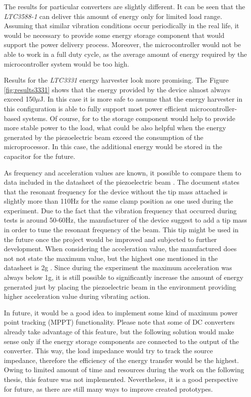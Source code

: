 \documentclass[12pt,a4paper]{article}
\begin{document}
The results for particular converters are slightly different. It can be seen that the \textit{LTC3588-1} can deliver this amount of energy only for limited load range. Assuming that similar vibration conditions occur periodically in the real life, it would be necessary to provide some energy storage component that would support the power delivery process. Moreover, the microcontroller would not be able to work in a full duty cycle, as the average amount of energy required by the microcontroller system would be too high.
\par
Results for the \textit{LTC3331} energy harvester look more promising. The Figure \ref{fig:results3331} shows that the energy provided by the device almost always exceed 150$\mu$J. In this case it is more safe to assume that the energy harvester in this configuration is able to fully support most power efficient microcontroller-based systems. Of course, for to the storage component would help to provide more stable power to the load, what could be also helpful when the energy generated by the piezoelectric beam exceed the consumption of the microprocessor. In this case, the additional energy would be stored in the capacitor for the future.
\par
As frequency and acceleration values are known, it possible to compare them to data included in the datasheet of the piezoelectric beam \cite{PPA}. The document states that the resonant frequency for the device without the tip mass attached is slightly more than 110Hz for the same clamp position as one used during the experiment. Due to the fact that the vibration frequency that occurred during tests is around 50-60Hz, the manufacturer of the device suggest to add a tip mass in order to tune the resonant frequency of the beam. This tip might be used in the future once the project would be improved and subjected to further development. When considering the acceleration value, the manufactured does not not state the maximum value, but the highest one mentioned in the datasheet is 2g \cite{PPA}. Since during the experiment the maximum acceleration was always below 1g, it is still possible to significantly increase the amount of energy generated just by placing the piezoelectric beam in the environment providing higher acceleration value during vibrating action.
\par

In future, it would be a good idea to implement some kind of maximum power point tracking (MPPT) functionality. Please note that some of DC converters already take advantage of this feature, but the following solution would make sense only if the energy storage components are connected to the output of the converter. This way, the load impedance would try to track the source impedance, therefore the efficiency of the energy transfer would be the highest. Owing to limited amount of time and resources during the work on the following thesis, this feature was not implemented. Nevertheless, it is a good perspective for future, as there are still many ways to improve created prototypes.
\par
\end{document}
